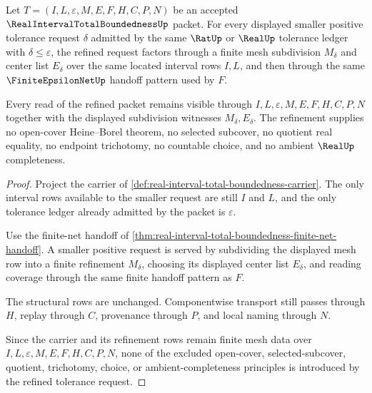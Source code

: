 \begin{theorem}
\label{thm:real-interval-total-boundedness-mesh-refinement}
Let $T=(I,L,\varepsilon,M,E,F,H,C,P,N)$ be an accepted $\RealIntervalTotalBoundednessUp$ packet. For every displayed smaller positive tolerance request $\delta$ admitted by the same $\RatUp$ or $\RealUp$ tolerance ledger with $\delta \leq \varepsilon$, the refined request factors through a finite mesh subdivision $M_{\delta}$ and center list $E_{\delta}$ over the same located interval rows $I,L$, and then through the same $\FiniteEpsilonNetUp$ handoff pattern used by $F$.

Every read of the refined packet remains visible through $I,L,\varepsilon,M,E,F,H,C,P,N$ together with the displayed subdivision witnesses $M_{\delta},E_{\delta}$. The refinement supplies no open-cover Heine--Borel theorem, no selected subcover, no quotient real equality, no endpoint trichotomy, no countable choice, and no ambient $\RealUp$ completeness.
\end{theorem}
\begin{proof}
Project the carrier of \autoref{def:real-interval-total-boundedness-carrier}. The only interval rows available to the smaller request are still $I$ and $L$, and the only tolerance ledger already admitted by the packet is $\varepsilon$.

Use the finite-net handoff of \autoref{thm:real-interval-total-boundedness-finite-net-handoff}. A smaller positive request is served by subdividing the displayed mesh row into a finite refinement $M_{\delta}$, choosing its displayed center list $E_{\delta}$, and reading coverage through the same finite handoff pattern as $F$.

The structural rows are unchanged. Componentwise transport still passes through $H$, replay through $C$, provenance through $P$, and local naming through $N$.

Since the carrier and its refinement rows remain finite mesh data over $I,L,\varepsilon,M,E,F,H,C,P,N$, none of the excluded open-cover, selected-subcover, quotient, trichotomy, choice, or ambient-completeness principles is introduced by the refined tolerance request.
\end{proof}


